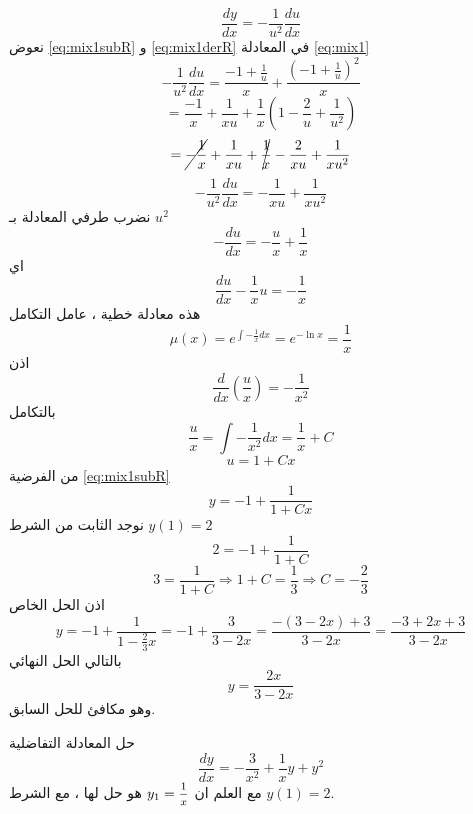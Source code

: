 \begin{solution}
\begin{equation}
		\label{eq:mix1derR}
		\frac{dy}{dx}=-\frac{1}{u^2}\frac{du}{dx}
	\end{equation}
	نعوض \eqref{eq:mix1subR} و \eqref{eq:mix1derR} في المعادلة \eqref{eq:mix1}
	\[
	-\frac{1}{u^2}\frac{du}{dx}
	=
	\frac{-1+\frac{1}{u}}{x}
	+
	\frac{\left(-1+\frac{1}{u}\right)^2}{x}
	\]
	\[
	=
	\frac{-1}{x}+\frac{1}{xu}
	+
	\frac{1}{x}\left(1-\frac{2}{u}+\frac{1}{u^2}\right)
	\]
	\[
	=
	\cancel{-\frac{1}{x}}+\frac{1}{xu}
	+
	\cancel{\frac{1}{x}}-\frac{2}{xu}+\frac{1}{xu^2}
	\]
	\[
	-\frac{1}{u^2}\frac{du}{dx}
	=
	-\frac{1}{xu}+\frac{1}{xu^2}
	\]
	نضرب طرفي المعادلة بـ $u^2$
	\[
	-\frac{du}{dx}
	=
	-\frac{u}{x}+\frac{1}{x}
	\]
	اي
	\begin{equation}
		\label{eq:mix1linearR}
		\frac{du}{dx}-\frac{1}{x}u=-\frac{1}{x}
	\end{equation}
	هذه معادلة خطية ، عامل التكامل
	\[
	\mu(x)=e^{\int -\frac{1}{x}dx}
	=e^{-\ln x}
	=\frac{1}{x}
	\]
	اذن
	\[
	\frac{d}{dx}\left(\frac{u}{x}\right)
	=
	-\frac{1}{x^2}
	\]
	بالتكامل
	\[
	\frac{u}{x}
	=
	\int -\frac{1}{x^2}dx
	=
	\frac{1}{x}+C
	\]
	\[
	u
	=
	1+Cx
	\]
	من الفرضية \eqref{eq:mix1subR}
	\[
	y=-1+\frac{1}{1+Cx}
	\]
	نوجد الثابت من الشرط $y(1)=2$
	\[
	2=-1+\frac{1}{1+C}
	\]
	\[
	3=\frac{1}{1+C}
	\Rightarrow
	1+C=\frac{1}{3}
	\Rightarrow
	C=-\frac{2}{3}
	\]
	اذن الحل الخاص
	\[
	y=-1+\frac{1}{1-\frac{2}{3}x} = -1 + \frac{3}{3-2x} = \frac{-(3-2x)+3}{3-2x} = \frac{-3+2x+3}{3-2x}
	\]
	بالتالي الحل النهائي
	\[
	y = \frac{2x}{3-2x}
	\]
		وهو مكافئ للحل السابق.
\end{solution}

\setcounter{equation}{0}
\begin{example}
	حل المعادلة التفاضلية
	\begin{equation}
		\label{eq:rec2}
		\frac{dy}{dx} = -\frac{3}{x^2} + \frac{1}{x}y + y^2
	\end{equation}
	مع العلم ان 
	$y_1=\mfrac{1}{x}$ هو حل لها ، مع الشرط $y(1) = 2 $.
\end{example}


